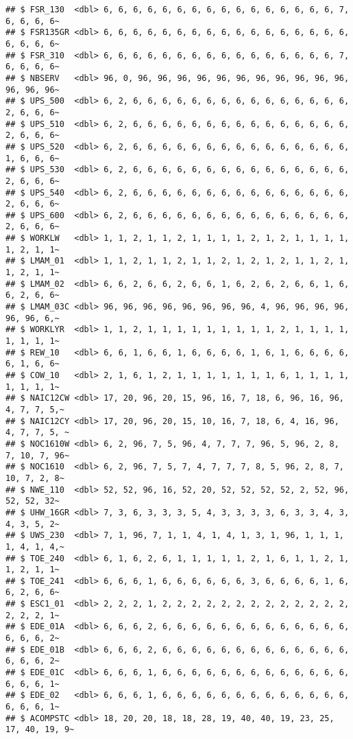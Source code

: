 \documentclass[
]{article}
\begin{document}
\begin{verbatim}
## $ FSR_130  <dbl> 6, 6, 6, 6, 6, 6, 6, 6, 6, 6, 6, 6, 6, 6, 6, 6, 7, 6, 6, 6, 6~
## $ FSR135GR <dbl> 6, 6, 6, 6, 6, 6, 6, 6, 6, 6, 6, 6, 6, 6, 6, 6, 6, 6, 6, 6, 6~
## $ FSR_310  <dbl> 6, 6, 6, 6, 6, 6, 6, 6, 6, 6, 6, 6, 6, 6, 6, 6, 7, 6, 6, 6, 6~
## $ NBSERV   <dbl> 96, 0, 96, 96, 96, 96, 96, 96, 96, 96, 96, 96, 96, 96, 96, 96~
## $ UPS_500  <dbl> 6, 2, 6, 6, 6, 6, 6, 6, 6, 6, 6, 6, 6, 6, 6, 6, 6, 2, 6, 6, 6~
## $ UPS_510  <dbl> 6, 2, 6, 6, 6, 6, 6, 6, 6, 6, 6, 6, 6, 6, 6, 6, 6, 2, 6, 6, 6~
## $ UPS_520  <dbl> 6, 2, 6, 6, 6, 6, 6, 6, 6, 6, 6, 6, 6, 6, 6, 6, 6, 1, 6, 6, 6~
## $ UPS_530  <dbl> 6, 2, 6, 6, 6, 6, 6, 6, 6, 6, 6, 6, 6, 6, 6, 6, 6, 2, 6, 6, 6~
## $ UPS_540  <dbl> 6, 2, 6, 6, 6, 6, 6, 6, 6, 6, 6, 6, 6, 6, 6, 6, 6, 2, 6, 6, 6~
## $ UPS_600  <dbl> 6, 2, 6, 6, 6, 6, 6, 6, 6, 6, 6, 6, 6, 6, 6, 6, 6, 2, 6, 6, 6~
## $ WORKLW   <dbl> 1, 1, 2, 1, 1, 2, 1, 1, 1, 1, 2, 1, 2, 1, 1, 1, 1, 1, 2, 1, 1~
## $ LMAM_01  <dbl> 1, 1, 2, 1, 1, 2, 1, 1, 2, 1, 2, 1, 2, 1, 1, 2, 1, 1, 2, 1, 1~
## $ LMAM_02  <dbl> 6, 6, 2, 6, 6, 2, 6, 6, 1, 6, 2, 6, 2, 6, 6, 1, 6, 6, 2, 6, 6~
## $ LMAM_03C <dbl> 96, 96, 96, 96, 96, 96, 96, 96, 4, 96, 96, 96, 96, 96, 96, 6,~
## $ WORKLYR  <dbl> 1, 1, 2, 1, 1, 1, 1, 1, 1, 1, 1, 1, 2, 1, 1, 1, 1, 1, 1, 1, 1~
## $ REW_10   <dbl> 6, 6, 1, 6, 6, 1, 6, 6, 6, 6, 1, 6, 1, 6, 6, 6, 6, 6, 1, 6, 6~
## $ COW_10   <dbl> 2, 1, 6, 1, 2, 1, 1, 1, 1, 1, 1, 1, 6, 1, 1, 1, 1, 1, 1, 1, 1~
## $ NAIC12CW <dbl> 17, 20, 96, 20, 15, 96, 16, 7, 18, 6, 96, 16, 96, 4, 7, 7, 5,~
## $ NAIC12CY <dbl> 17, 20, 96, 20, 15, 10, 16, 7, 18, 6, 4, 16, 96, 4, 7, 7, 5, ~
## $ NOC1610W <dbl> 6, 2, 96, 7, 5, 96, 4, 7, 7, 7, 96, 5, 96, 2, 8, 7, 10, 7, 96~
## $ NOC1610  <dbl> 6, 2, 96, 7, 5, 7, 4, 7, 7, 7, 8, 5, 96, 2, 8, 7, 10, 7, 2, 8~
## $ NWE_110  <dbl> 52, 52, 96, 16, 52, 20, 52, 52, 52, 52, 2, 52, 96, 52, 52, 32~
## $ UHW_16GR <dbl> 7, 3, 6, 3, 3, 3, 5, 4, 3, 3, 3, 3, 6, 3, 3, 4, 3, 4, 3, 5, 2~
## $ UWS_230  <dbl> 7, 1, 96, 7, 1, 1, 4, 1, 4, 1, 3, 1, 96, 1, 1, 1, 1, 4, 1, 4,~
## $ TOE_240  <dbl> 6, 1, 6, 2, 6, 1, 1, 1, 1, 1, 2, 1, 6, 1, 1, 2, 1, 1, 2, 1, 1~
## $ TOE_241  <dbl> 6, 6, 6, 1, 6, 6, 6, 6, 6, 6, 3, 6, 6, 6, 6, 1, 6, 6, 2, 6, 6~
## $ ESC1_01  <dbl> 2, 2, 2, 1, 2, 2, 2, 2, 2, 2, 2, 2, 2, 2, 2, 2, 2, 2, 2, 2, 1~
## $ EDE_01A  <dbl> 6, 6, 6, 2, 6, 6, 6, 6, 6, 6, 6, 6, 6, 6, 6, 6, 6, 6, 6, 6, 2~
## $ EDE_01B  <dbl> 6, 6, 6, 2, 6, 6, 6, 6, 6, 6, 6, 6, 6, 6, 6, 6, 6, 6, 6, 6, 2~
## $ EDE_01C  <dbl> 6, 6, 6, 1, 6, 6, 6, 6, 6, 6, 6, 6, 6, 6, 6, 6, 6, 6, 6, 6, 1~
## $ EDE_02   <dbl> 6, 6, 6, 1, 6, 6, 6, 6, 6, 6, 6, 6, 6, 6, 6, 6, 6, 6, 6, 6, 1~
## $ ACOMPSTC <dbl> 18, 20, 20, 18, 18, 28, 19, 40, 40, 19, 23, 25, 17, 40, 19, 9~

\end{verbatim}
\end{document}
